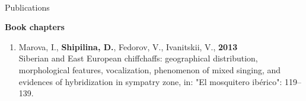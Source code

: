 \documentclass[10pt]{article}
\begin{document}
\begin{cv}






\newpage
\ \\[-60pt]
\begin{cvlist}{Publications}
\item
\end{cvlist}




\textbf{\quad Book chapters}
	
            \begin{enumerate}%
		\item  Marova, I., \textbf{Shipilina, D.}, Fedorov, V., Ivanitskii, V., \textbf{2013}\\
            Siberian and East European chiffchaffs: geographical distribution, morphological features, vocalization, phenomenon of mixed singing, and evidences of hybridization in sympatry zone, in: "El mosquitero ib{\'e}rico": 119--139.
\end{enumerate}%
	

\end{cv}
\end{document}
